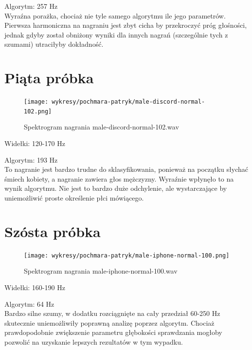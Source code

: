 \documentclass[a4paper,12pt]{extarticle}
\begin{document}
\noindent Algorytm: 257 Hz\\

\noindent Wyraźna porażka, chociaż nie tyle samego algorytmu ile jego parametrów. Pierwsza harmoniczna na nagraniu jest zbyt cicha by przekroczyć próg głośności, jednak gdyby został obniżony wyniki dla innych nagrań (szczególnie tych z szumami) utraciłyby dokładność.

\newpage

\section*{Piąta próbka}

\begin{figure}[h!]
\centering
\texttt{[image: wykresy/pochmara-patryk/male-discord-normal-102.png]}
\caption{Spektrogram nagrania male-discord-normal-102.wav}
\end{figure}

\noindent Widełki: 120-170 Hz

\noindent Algorytm: 193 Hz\\

\noindent To nagranie jest bardzo trudne do sklasyfikowania, ponieważ na początku słychać śmiech kobiety, a nagranie zawiera głos mężczyzny. Wyraźnie wpłynęło to na wynik algorytmu. Nie jest to bardzo duże odchylenie, ale wystarczające by uniemożliwić proste określenie płci mówiącego.

\newpage

\section*{Szósta próbka}

\begin{figure}[h!]
\centering
\texttt{[image: wykresy/pochmara-patryk/male-iphone-normal-100.png]}
\caption{Spektrogram nagrania male-iphone-normal-100.wav}
\end{figure}

\noindent Widełki: 160-190 Hz

\noindent Algorytm: 64 Hz\\

\noindent Bardzo silne szumy, w dodatku rozciągnięte na cały przedział 60-250 Hz skutecznie uniemożliwiły poprawną analizę poprzez algorytm. Chociaż prawdopodobnie zwiększenie parametru głębokości sprawdzania mogłoby pozwolić na uzyskanie lepszych rezultatów w tym wypadku.
\end{document}
